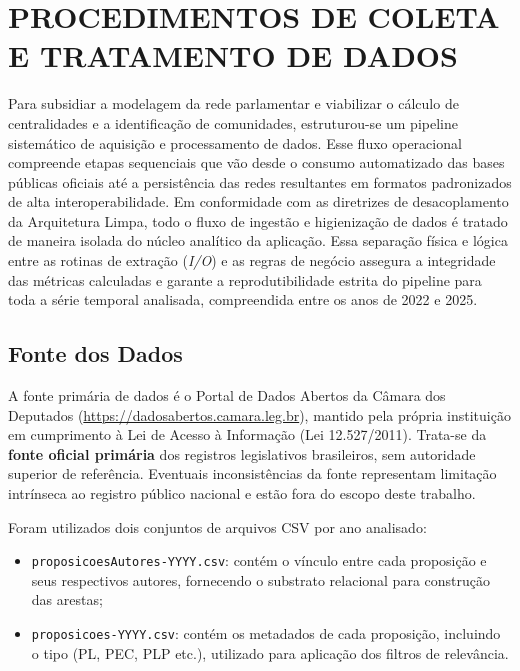 \documentclass[
      12pt,
      a4paper,
      openright,
      oneside,
      chapter=TITLE,
      section=TITLE,
      english,
      french,
      spanish,
      brazilian
    ]{abntex2}
\begin{document}
    \section{PROCEDIMENTOS DE COLETA E TRATAMENTO DE DADOS}
    \label{sec:procedimentos}
    
    Para subsidiar a modelagem da rede parlamentar e viabilizar o cálculo de centralidades e a identificação de comunidades, estruturou-se um pipeline sistemático de aquisição e processamento de dados. Esse fluxo operacional compreende etapas sequenciais que vão desde o consumo automatizado das bases públicas oficiais até a persistência das redes resultantes em formatos padronizados de alta interoperabilidade. Em conformidade com as diretrizes de desacoplamento da Arquitetura Limpa, todo o fluxo de ingestão e higienização de dados é tratado de maneira isolada do núcleo analítico da aplicação. Essa separação física e lógica entre as rotinas de extração (\textit{I/O}) e as regras de negócio assegura a integridade das métricas calculadas e garante a reprodutibilidade estrita do pipeline para toda a série temporal analisada, compreendida entre os anos de 2022 e 2025.
    
    \subsection{Fonte dos Dados}
    
    A fonte primária de dados é o Portal de Dados Abertos da Câmara dos Deputados (\url{https://dadosabertos.camara.leg.br}), mantido pela própria instituição em cumprimento à Lei de Acesso à Informação (Lei 12.527/2011). Trata-se da \textbf{fonte oficial primária} dos registros legislativos brasileiros, sem autoridade superior de referência. Eventuais inconsistências da fonte representam limitação intrínseca ao registro público nacional e estão fora do escopo deste trabalho.
    
    Foram utilizados dois conjuntos de arquivos CSV por ano analisado:
    
    \begin{itemize}
        \item \texttt{proposicoesAutores-YYYY.csv}: contém o vínculo entre cada proposição e seus respectivos autores, fornecendo o substrato relacional para construção das arestas;
        \item \texttt{proposicoes-YYYY.csv}: contém os metadados de cada proposição, incluindo o tipo (PL, PEC, PLP etc.), utilizado para aplicação dos filtros de relevância.
    \end{itemize}
    
\end{document}
